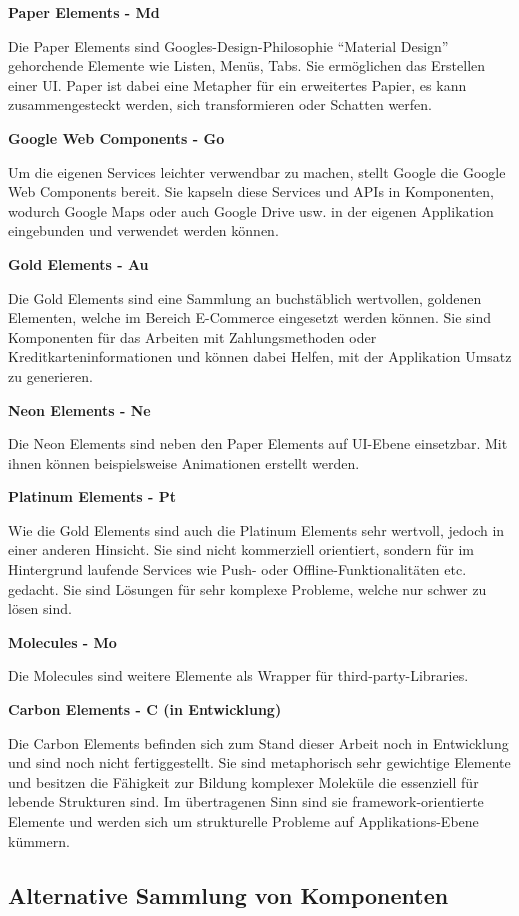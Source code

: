 \textbf{Paper Elements - Md}

Die Paper Elements sind Googles-Design-Philosophie ``Material Design'' gehorchende Elemente wie Listen, Menüs, Tabs. Sie ermöglichen das Erstellen einer UI. Paper ist dabei eine Metapher für ein erweitertes Papier, es kann zusammengesteckt werden, sich transformieren oder Schatten werfen.

\textbf{Google Web Components - Go}

Um die eigenen Services leichter verwendbar zu machen, stellt Google die Google Web Components bereit. Sie kapseln diese Services und APIs in Komponenten, wodurch Google Maps oder auch Google Drive usw. in der eigenen Applikation eingebunden und verwendet werden können.

\textbf{Gold Elements - Au}

Die Gold Elements sind eine Sammlung an buchstäblich wertvollen, goldenen Elementen, welche im Bereich E-Commerce eingesetzt werden können. Sie sind Komponenten für das Arbeiten mit Zahlungsmethoden oder Kreditkarteninformationen und können dabei Helfen, mit der Applikation Umsatz zu generieren.

\textbf{Neon Elements - Ne}

Die Neon Elements sind neben den Paper Elements auf UI-Ebene einsetzbar. Mit ihnen können beispielsweise Animationen erstellt werden.

\textbf{Platinum Elements - Pt}

Wie die Gold Elements sind auch die Platinum Elements sehr wertvoll, jedoch in einer anderen Hinsicht. Sie sind nicht kommerziell orientiert, sondern für im Hintergrund laufende Services wie Push- oder Offline-Funktionalitäten etc. gedacht. Sie sind Lösungen für sehr komplexe Probleme, welche nur schwer zu lösen sind.

\textbf{Molecules - Mo}

Die Molecules sind weitere Elemente als Wrapper für third-party-Libraries.

\textbf{Carbon Elements - C (in Entwicklung)}

Die Carbon Elements befinden sich zum Stand dieser Arbeit noch in Entwicklung und sind noch nicht fertiggestellt. Sie sind metaphorisch sehr gewichtige Elemente und besitzen die Fähigkeit zur Bildung komplexer Moleküle die essenziell für lebende Strukturen sind. Im übertragenen Sinn sind sie framework-orientierte Elemente und werden sich um strukturelle Probleme auf Applikations-Ebene kümmern.

\subsection{Alternative Sammlung von Komponenten}\label{alternative-sammlung-von-komponenten}

